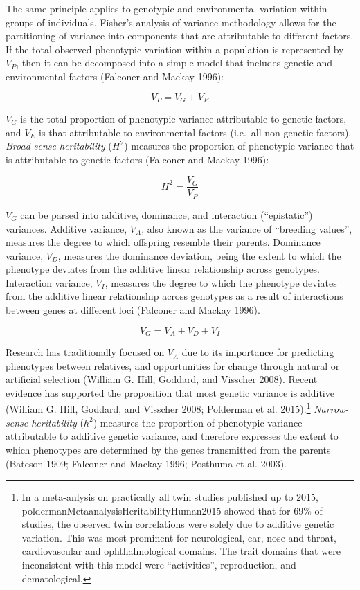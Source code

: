 \documentclass[
]{book}
\begin{document}
The same principle applies to genotypic and environmental variation within groups of individuals. Fisher's analysis of variance methodology allows for the partitioning of variance into components that are attributable to different factors. If the total observed phenotypic variation within a population is represented by \(V_{P}\), then it can be decomposed into a simple model that includes genetic and environmental factors (Falconer and Mackay 1996):

\begin{equation}
V_{P} = V_{G} + V_{E} \label{eq:pge}
\end{equation}

\(V_{G}\) is the total proportion of phenotypic variance attributable to genetic factors, and \(V_{E}\) is that attributable to environmental factors (i.e.~all non-genetic factors). \emph{Broad-sense heritability} (\(H^2\)) measures the proportion of phenotypic variance that is attributable to genetic factors (Falconer and Mackay 1996):

\[
H^2 = \frac{V_G}{V_P}
\]

\(V_{G}\) can be parsed into additive, dominance, and interaction (``epistatic'') variances. Additive variance, \(V_A\), also known as the variance of ``breeding values'', measures the degree to which offspring resemble their parents. Dominance variance, \(V_D\), measures the dominance deviation, being the extent to which the phenotype deviates from the additive linear relationship across genotypes. Interaction variance, \(V_I\), measures the degree to which the phenotype deviates from the additive linear relationship across genotypes as a result of interactions between genes at different loci (Falconer and Mackay 1996).

\begin{equation}
V_G = V_A + V_D + V_I \label{eq:gendecomp}
\end{equation}

Research has traditionally focused on \(V_A\) due to its importance for predicting phenotypes between relatives, and opportunities for change through natural or artificial selection (William G. Hill, Goddard, and Visscher 2008). Recent evidence has supported the proposition that most genetic variance is additive (William G. Hill, Goddard, and Visscher 2008; Polderman et al. 2015).\footnote{In a meta-anlysis on practically all twin studies published up to 2015, poldermanMetaanalysisHeritabilityHuman2015 showed that for 69\% of studies, the observed twin correlations were solely due to additive genetic variation. This was most prominent for neurological, ear, nose and throat, cardiovascular and ophthalmological domains. The trait domains that were inconsistent with this model were ``activities'', reproduction, and dematological.} \emph{Narrow-sense heritability} (\(h^2\)) measures the proportion of phenotypic variance attributable to additive genetic variance, and therefore expresses the extent to which phenotypes are determined by the genes transmitted from the parents (Bateson 1909; Falconer and Mackay 1996; Posthuma et al. 2003).
\end{document}
